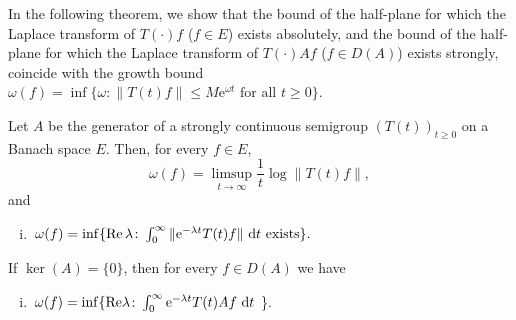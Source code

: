 In the following theorem, we show that the bound of the half-plane for which the Laplace transform of $T(\cdot)f$ ($f \in E$) exists absolutely, and the bound of the half-plane for which the Laplace transform of $T(\cdot)Af$ ($f \in D(A)$) exists strongly, coincide with the growth bound $\omega(f) = \inf\{\omega\colon\|T(t)f\| \leq M\mathrm{e}^{\omega t} \text{ for all } t \geq 0\}$.
\begin{theorem}\label{thm:a4-1.3}
Let $A$ be the generator of a strongly continuous semigroup $ (T(t))_{t \geq 0} $ on a Banach space $E$. 
Then, for every $f \in E$,
\begin{equation}\label{eq:a4-1.2}
\omega(f) = \limsup_{t \to \infty} \frac{1}{t}\log\|T(t)f\|, 
\end{equation}
and
\begin{enumerate}[(i)]
\item 
$\,\omega(f) = \inf\{\mathop{}\!\mathrm{Re}\,\lambda\colon\int_{0}^{\infty} \|\mathrm{e}^{-\lambda t} T(t)f\| \,\mathop{}\!\mathrm{d}{t} \text{ exists}\}.$
\end{enumerate}
If\/ $\ker(A) = \{0\}$, then for every $f \in D(A)$ we have
\begin{enumerate}[(i), resume]
\item 
$\,\omega(f) = \inf\{\mathop{}\!\mathrm{Re}\lambda\colon\int_{0}^{\infty} \mathrm{e}^{-\lambda t} T(t)Af \,\mathop{}\!\mathrm{d}{t}$
\}.
\end{enumerate}
\end{theorem}
